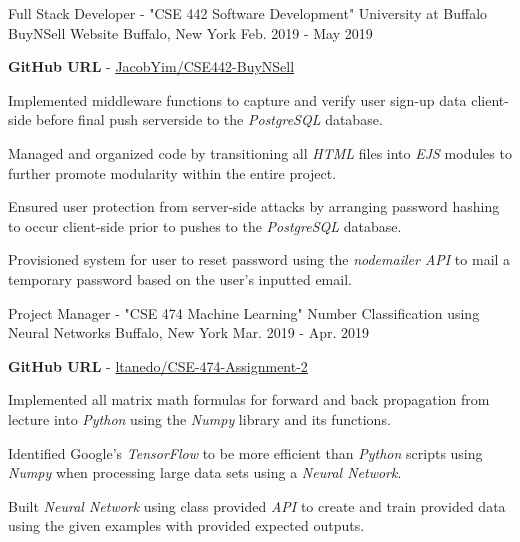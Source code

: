 

\begin{cventries}

 \cventry
    {Full Stack Developer - "CSE 442 Software Development"} %
    {University at Buffalo BuyNSell Website} %
    {Buffalo, New York} %
    {Feb. 2019 - May 2019} %
    {
      \begin{cvitems} %
      {\textbf{GitHub URL}   -  \href{https://github.com/JacobYim/CSE442-BuyNSell}{JacobYim/CSE442-BuyNSell}}
        \item\item {Implemented middleware functions to capture and verify user sign-up data client-side before final push serverside to the \textit{PostgreSQL} database.}
        \item {Managed and organized code by transitioning all \textit{HTML} files into \textit{EJS} modules to further promote modularity within the entire project.}
        \item {Ensured user protection from server-side attacks by arranging password hashing to occur client-side prior to pushes to the \textit{PostgreSQL} database.}
        \item {Provisioned system for user to reset password using the \textit{nodemailer API} to mail a temporary password based on the user's inputted email.}
      \end{cvitems}
    }
    
\cventry
    {Project Manager - "CSE 474 Machine Learning"} %
    {Number Classification using Neural Networks} %
    {Buffalo, New York} %
    {Mar. 2019 - Apr. 2019} %
    {
      \begin{cvitems} %
      {\textbf{GitHub URL}   -  \href{https://github.com/ltanedo/CSE-474-Assignment-2}{ltanedo/CSE-474-Assignment-2}}
        \item\item {Implemented all matrix math formulas for forward and back propagation from lecture into \textit{Python} using the \textit{Numpy} library and its functions.}
        \item {Identified Google’s \textit{TensorFlow} to be more efficient than \textit{Python} scripts using \textit{Numpy} when processing large data sets using a \textit{Neural Network}.}
        \item {Built \textit{Neural Network} using class provided \textit{API} to create and train provided data using the given examples with provided expected outputs.}
      \end{cvitems}
    }

\end{cventries}